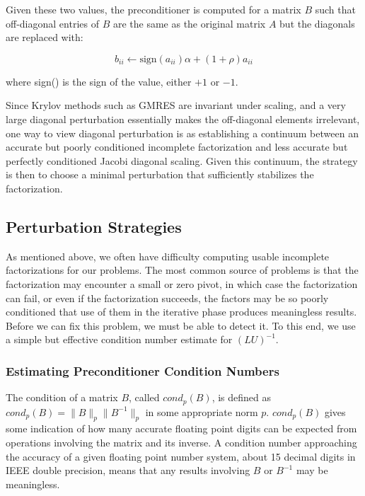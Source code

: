 \documentclass[12pt,relax]{AztecOOUserGuide}
\begin{document}
Given these two values, the preconditioner is computed for a matrix
$B$ such that off-diagonal entries of $B$ are the same as the
original matrix $A$ but the diagonals are replaced with:

\begin{equation}\label{diagaonalperturbations}
    b_{ii} \leftarrow \textrm{sign$(a_{ii})$}\alpha + (1+\rho)a_{ii}
\end{equation}

where sign() is the sign of the value, either $+1$ or $-1$.

Since Krylov methods such as GMRES are invariant under scaling, and
a very large diagonal
perturbation essentially makes the off-diagonal elements irrelevant,
one way to view diagonal perturbation is as establishing a continuum
between an accurate but poorly conditioned incomplete factorization
and less accurate but perfectly conditioned Jacobi diagonal scaling.
Given this continuum, the strategy is then to choose a minimal perturbation
that sufficiently stabilizes the factorization.


\subsection{Perturbation Strategies}

As mentioned above, we often have difficulty computing usable incomplete
factorizations for our problems.  The most common source of problems
is that the factorization may encounter a small or zero pivot,
in which case the factorization can fail, or even if the factorization
succeeds, the factors may be so poorly conditioned that use of them in
the iterative phase produces meaningless results.  Before we can fix
this problem, we must be able to detect it.  To this end, we use a
simple but effective condition number estimate for $(LU)^{-1}$.

\subsubsection{Estimating Preconditioner Condition Numbers}

The condition of a matrix $B$, called $cond_p(B)$, is defined as
$cond_p(B)
= \|B\|_p\|B^{-1}\|_p$ in some appropriate norm $p$.  $cond_p(B)$
gives some indication of how many accurate floating point
digits can be expected from operations involving the matrix and its
inverse.  A condition number approaching the accuracy of a given
floating point number system, about 15 decimal digits in IEEE double
precision, means that any results involving $B$ or $B^{-1}$ may be
meaningless.
\end{document}

